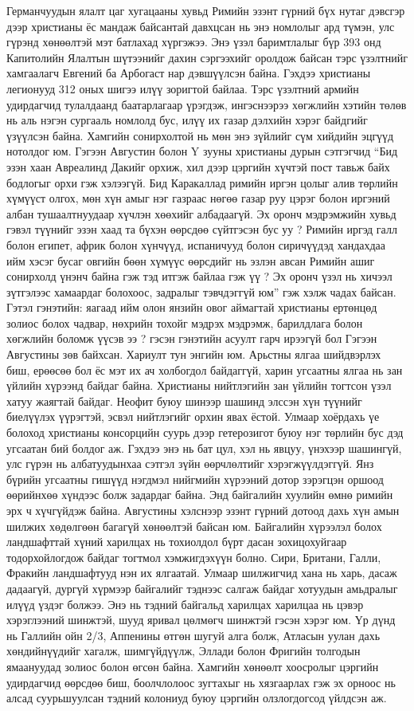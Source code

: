 Германчуудын ялалт цаг хугацааны хувьд Римийн эзэнт гүрний бүх нутаг дэвсгэр дээр христианы ёс мандаж байсантай давхцсан нь энэ номлолыг ард түмэн, улс гүрэнд хөнөөлтэй мэт батлахад хүргэжээ. Энэ үзэл баримтлалыг бүр 393 онд Капитолийн Ялалтын шүтээнийг дахин сэргээхийг оролдож байсан тэрс үзэлтнийг хамгаалагч Евгений ба Арбогаст нар дэвшүүлсэн байна. Гэхдээ христианы легионууд 312 оных шигээ илүү зоригтой байлаа. Тэрс үзэлтний армийн удирдагчид тулалдаанд баатарлагаар үрэгдэж, ингэснээрээ хөгжлийн хэтийн төлөв нь аль нэгэн сургааль номлолд бус, илүү их газар дэлхийн хэрэг байдгийг үзүүлсэн байна. Хамгийн сонирхолтой нь мөн энэ зүйлийг сүм хийдийн эцгүүд нотолдог юм.
Гэгээн Августин болон Y зууны христианы дурын сэтгэгчид “Бид эзэн хаан Авреалинд Дакийг орхиж, хил дээр цэргийн хүчтэй пост тавьж байх бодлогыг орхи гэж хэлээгүй. Бид Каракаллад римийн иргэн цолыг алив төрлийн хүмүүст олгох, мөн хүн амыг нэг газраас нөгөө газар руу цэрэг болон иргэний албан тушаалтнуудаар хүчлэн хөөхийг албадаагүй. Эх оронч мэдрэмжийн хувьд гэвэл түүнийг эзэн хаад та бүхэн өөрсдөө сүйтгэсэн бус уу ? Римийн иргэд галл болон египет, африк болон хүнчүүд, испаничууд болон сиричүүдэд хандахдаа ийм хэсэг бусаг овгийн бөөн хүмүүс өөрсдийг нь эзлэн авсан Римийн ашиг сонирхолд үнэнч байна гэж тэд итгэж байлаа гэж үү ? Эх оронч үзэл нь хичээл зүтгэлээс хамаардаг болохоос, задралыг тэвчдэггүй юм” гэж хэлж чадах байсан. Гэтэл гэнэтийн: яагаад ийм олон янзийн овог аймагтай христианы ертөнцөд золиос болох чадвар, нөхрийн тохойг мэдрэх мэдрэмж, барилдлага болон хөгжлийн боломж үүсэв ээ ? гэсэн гэнэтийн асуулт гарч ирээгүй бол Гэгээн Августины зөв байхсан.
Хариулт тун энгийн юм. Арьстны ялгаа шийдвэрлэх биш, ерөөсөө бол ёс мэт их ач холбогдол байдаггүй, харин угсаатны ялгаа нь зан үйлийн хүрээнд байдаг байна. Христианы нийтлэгийн зан үйлийн тогтсон үзэл хатуу жаягтай байдаг. Неофит буюу шинээр шашинд элссэн хүн түүнийг биелүүлэх үүрэгтэй, эсвэл нийтлэгийг орхин явах ёстой. Улмаар хоёрдахь үе болоход христианы консорцийн суурь дээр гетерозигот буюу нэг төрлийн бус дэд угсаатан бий болдог аж. Гэхдээ энэ нь бат цул, хэл нь явцуу, үнэхээр шашингүй, улс гүрэн нь албатуудынхаа сэтгэл зүйн өөрчлөлтийг хэрэгжүүлдэггүй. Янз бүрийн угсаатны гишүүд нэгдмэл нийгмийн хүрээний дотор зэрэгцэн оршоод өөрийнхөө хүндээс болж задардаг байна. Энд байгалийн хуулийн өмнө римийн эрх ч хүчгүйдэж байна.
Августины хэлснээр эзэнт гүрний дотоод дахь хүн амын шилжих хөдөлгөөн багагүй хөнөөлтэй байсан юм. Байгалийн хүрээлэл болох ландшафттай хүний харилцах нь тохиолдол бүрт дасан зохицохуйгаар тодорхойлогдож байдаг тогтмол хэмжигдэхүүн болно. Сири, Британи, Галли, Фракийн ландшафтууд нэн их ялгаатай. Улмаар шилжигчид хана нь харь, дасаж дадаагүй, дургүй хүрмээр байгалийг тэднээс салгаж байдаг хотуудын амьдралыг илүүд үздэг болжээ. Энэ нь тэдний байгальд харилцах харилцаа нь цэвэр хэрэглээний шинжтэй, шууд яривал цөлмөгч шинжтэй гэсэн хэрэг юм. Үр дүнд нь Галлийн ойн 2/3, Аппенины өтгөн шугуй алга болж, Атласын уулан дахь хөндийнүүдийг хагалж, шимгүйдүүлж, Эллади болон Фригийн толгодын ямаануудад золиос болон өгсөн байна. Хамгийн хөнөөлт хоосролыг цэргийн удирдагчид өөрсдөө биш, боолчлолоос зугтахыг нь хязгаарлах гэж эх орноос нь алсад суурьшуулсан тэдний колониуд буюу цэргийн олзлогдогсод үйлдсэн аж.
